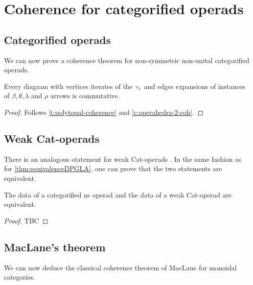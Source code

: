 
\section{Coherence for categorified operads} 
\label{s:catoperads}

\subsection{Categorified operads}

We can now prove a coherence theorem for non-symmetric non-unital categorified operads. 

\begin{thm}
\label{t:coherence-operahedra}
    Every diagram with vertices iterates of the $\circ_i$ and edges expansions of instances of $\beta, \theta, \lambda$ and $\rho$ arrows is commutative. 
\end{thm}

\begin{proof}
    Follows \cref{t:polytopal-coherence} and \cref{c:operahedra-2-coh}.
\end{proof}

\subsection{Weak Cat-operads}

There is an analogous statement for weak Cat-operads \cite[Proposition 14.2]{DP15}. In the same fashion as for \cref{thm:equivalenceDPGLA}, one can prove that the two statements are equivalent. 

\begin{definition}
\end{definition}

\begin{thm} \label{thm:equivalenceDPGLA}
    The data of a categorified ns operad and the data of a weak Cat-operad are equivalent.  
\end{thm}

\begin{proof}
    TBC
\end{proof}


\subsection{MacLane's theorem}

We can now deduce the classical coherence theorem of MacLane for monoidal categories. 

